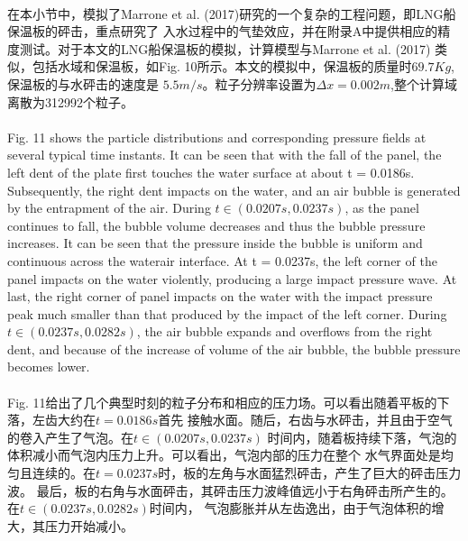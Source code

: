 \documentclass[UTF8]{ctexart}
\begin{document}
\paragraph{\quad}在本小节中，模拟了Marrone et al. (2017)研究的一个复杂的工程问题，即LNG船保温板的砰击，重点研究了
                入水过程中的气垫效应，并在附录A中提供相应的精度测试。对于本文的LNG船保温板的模拟，计算模型与Marrone et al. (2017)
                类似，包括水域和保温板，如Fig. 10所示。本文的模拟中，保温板的质量时$69.7Kg$,保温板的与水砰击的速度是
                $5.5m/s$。粒子分辨率设置为$\Delta x = 0.002m$,整个计算域离散为312992个粒子。

\paragraph{\quad}Fig. 11 shows the particle distributions and corresponding pressure 
                fields at several typical time instants. It can be seen that with the 
                fall of the panel, the left dent of the plate first touches the water 
                surface at about t = 0.0186s. Subsequently, the right dent impacts on 
                the water, and an air bubble is generated by the entrapment of the air. 
                During $t \in (0.0207s, 0.0237s)$, as the panel continues to fall, the bubble 
                volume decreases and thus the bubble pressure increases. It can be seen 
                that the pressure inside the bubble is uniform and continuous across the 
                waterair interface. At t = 0.0237s, the left corner of the panel impacts 
                on the water violently, producing a large impact pressure wave. At last, 
                the right corner of panel impacts on the water with the impact pressure 
                peak much smaller than that produced by the impact of the left corner. 
                During $t \in (0.0237s, 0.0282s)$, the air bubble expands and overflows from 
                the right dent, and because of the increase of volume of the air bubble, 
                the bubble pressure becomes lower.
\paragraph{\quad}Fig. 11给出了几个典型时刻的粒子分布和相应的压力场。可以看出随着平板的下落，左齿大约在$t=0.0186s$首先
                接触水面。随后，右齿与水砰击，并且由于空气的卷入产生了气泡。在$t \in (0.0207s,0.0237s)$
                时间内，随着板持续下落，气泡的体积减小而气泡内压力上升。可以看出，气泡内部的压力在整个
                水气界面处是均匀且连续的。在$t=0.0237s$时，板的左角与水面猛烈砰击，产生了巨大的砰击压力波。
                最后，板的右角与水面砰击，其砰击压力波峰值远小于右角砰击所产生的。在$t \in (0.0237s,0.0282s)$时间内，
                气泡膨胀并从左齿逸出，由于气泡体积的增大，其压力开始减小。
\end{document}
